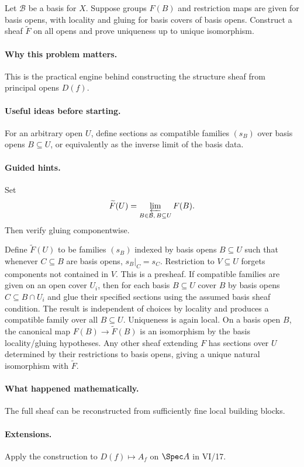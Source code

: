 \begin{problem}
Let $\mathcal B$ be a basis for $X$. Suppose groups $F(B)$ and restriction maps are given for basis opens, with locality and gluing for basis covers of basis opens. Construct a sheaf $\widetilde F$ on all opens and prove uniqueness up to unique isomorphism.
\end{problem}

\paragraph{Why this problem matters.}
This is the practical engine behind constructing the structure sheaf from principal opens $D(f)$.

\paragraph{Useful ideas before starting.}
For an arbitrary open $U$, define sections as compatible families $(s_B)$ over basis opens $B\subseteq U$, or equivalently as the inverse limit of the basis data.

\paragraph{Guided hints.}
Set
\[
\widetilde F(U)=\varprojlim_{B\in\mathcal B,\,B\subseteq U}F(B).
\]
Then verify gluing componentwise.

\ifdefined\FullProblemDossiers
\begin{solution}
Define $\widetilde F(U)$ to be families $(s_B)$ indexed by basis opens $B\subseteq U$ such that whenever $C\subseteq B$ are basis opens, $s_B|_C=s_C$. Restriction to $V\subseteq U$ forgets components not contained in $V$. This is a presheaf. If compatible families are given on an open cover $U_i$, then for each basis $B\subseteq U$ cover $B$ by basis opens $C\subseteq B\cap U_i$ and glue their specified sections using the assumed basis sheaf condition. The result is independent of choices by locality and produces a compatible family over all $B\subseteq U$. Uniqueness is again local. On a basis open $B$, the canonical map $F(B)\to\widetilde F(B)$ is an isomorphism by the basis locality/gluing hypotheses. Any other sheaf extending $F$ has sections over $U$ determined by their restrictions to basis opens, giving a unique natural isomorphism with $\widetilde F$.
\end{solution}

\paragraph{What happened mathematically.}
The full sheaf can be reconstructed from sufficiently fine local building blocks.

\paragraph{Extensions.}
Apply the construction to $D(f)\mapsto A_f$ on $\Spec A$ in VI/17.
\fi

